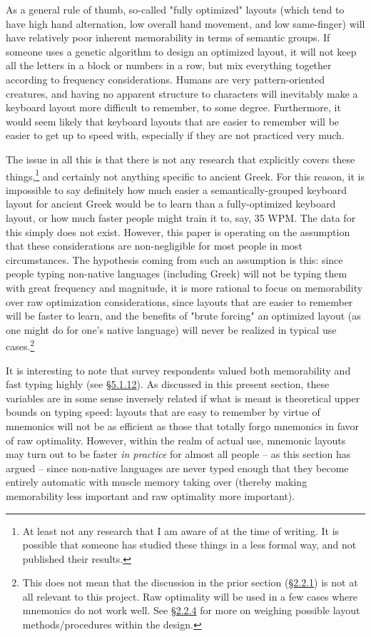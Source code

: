 \documentclass[11pt]{article}
\begin{document}
As a general rule of thumb, so-called "fully optimized" layouts (which tend to have high hand alternation, low overall hand movement, and low same-finger) will have relatively poor inherent memorability in terms of semantic groups. If someone uses a genetic algorithm to design an optimized layout, it will not keep all the letters in a block or numbers in a row, but mix everything together according to frequency considerations. Humans are very pattern-oriented creatures, and having no apparent structure to characters will inevitably make a keyboard layout more difficult to remember, to some degree. Furthermore, it would seem likely that keyboard layouts that are easier to remember will be easier to get up to speed with, especially if they are not practiced very much.

The issue in all this is that there is not any research that explicitly covers these things,\footnote{At least not any research that I am aware of at the time of writing. It is possible that someone has studied these things in a less formal way, and not published their results.} and certainly not anything specific to ancient Greek. For this reason, it is impossible to say definitely how much easier a semantically-grouped keyboard layout for ancient Greek would be to learn than a fully-optimized keyboard layout, or how much faster people might train it to, say, 35 WPM. The data for this simply does not exist. However, this paper is operating on the assumption that these considerations are non-negligible for most people in most circumstances. The hypothesis coming from such an assumption is this: since people typing non-native languages (including Greek) will not be typing them with great frequency and magnitude, it is more rational to focus on memorability over raw optimization considerations, since layouts that are easier to remember will be faster to learn, and the benefits of "brute forcing" an optimized layout (as one might do for one's native language) will never be realized in typical use cases.\footnote{This does not mean that the discussion in the prior section (\hyperref[sec:org02f3267]{§2.2.1}) is not at all relevant to this project. Raw optimality will be used in a few cases where mnemonics do not work well. See \hyperref[sec:orgd5c000b]{§2.2.4} for more on weighing possible layout methods/procedures within the design.}

It is interesting to note that survey respondents valued both memorability and fast typing highly (see \hyperref[sec:org4dca7a6]{§5.1.12}). As discussed in this present section, these variables are in some sense inversely related if what is meant is theoretical upper bounds on typing speed: layouts that are easy to remember by virtue of mnemonics will not be as efficient as those that totally forgo mnemonics in favor of raw optimality. However, within the realm of actual use, mnemonic layouts may turn out to be faster \emph{in practice} for almost all people -- as this section has argued -- since non-native languages are never typed enough that they become entirely automatic with muscle memory taking over (thereby making memorability less important and raw optimality more important).
\end{document}
